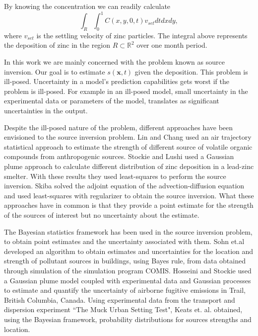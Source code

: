 \documentclass[12pt]{book}
\newcommand{\x}{\textbf{x}}
\begin{document}
 By knowing the concentration we can readily calculate
\begin{equation*}
\int_{R}\int_{0}^{1} C(x,y,0,t)v_{set}dtdxdy,
\end{equation*}
where $v_{set}$ is the settling velocity of zinc particles. 
The integral above represents the deposition of zinc in the region 
$R\subset\mathbb{R}^{2}$ over one month period.

In this work we are mainly concerned with the problem known as source inversion.
Our goal is to estimate $s(\x,t)$ given the deposition.
This problem is ill-posed\cite{enting1990inverse}.
Uncertainty in a model's prediction capabilities gets worst if the problem
is ill-posed. For example in an ill-posed model, small uncertainty
in the experimental data or parameters of the model, translates
as significant uncertainties in the output.

Despite the ill-posed nature of the problem, different
approaches have been envisioned to the source inversion
problem. Lin and Chang \cite{lin2002relative} used an air
trajectory statistical approach to estimate
the strength of different source of volatile organic compounds
from anthropogenic sources. Stockie and Lushi \cite{lushi2010inverse} 
used a Gaussian plume approach to calculate different distribution
of zinc deposition in a lead-zinc smelter. With these results
they used  least-squares to perform the source inversion.
Skiba \cite{skiba2003method}  solved the adjoint equation
of the advection-diffusion equation and used least-squares 
with regularizer to obtain the source inversion. What
these approaches have in common is that they provide a point
estimate for the strength of the sources of interest but
no uncertainty about the estimate.

The Bayesian statistics framework has been used in the source inversion
problem, to obtain point estimates and the uncertainty associated 
with them. Sohn et.al \cite{sohn2002rapidly} developed an 
algorithm to obtain estimates and uncertainties for
the location and strength of pollutant sources in buildings, using
Bayes rule, from data obtained through simulation of the
simulation program COMIS. Hosseini and Stockie \cite{hosseini2016bayesian}
used a Gaussian plume model coupled with 
experimental data and  Gaussian processes to estimate
and quantify the uncertainty of airborne fugitive
emissions in Trail, British Columbia, Canada. Using
experimental data from the transport and dispersion 
experiment ``The Muck Urban Setting Test", Keats et. al. \cite{keats2007bayesian}
obtained, using the Bayesian framework, probability distributions for sources strengths
and location.
\end{document}
